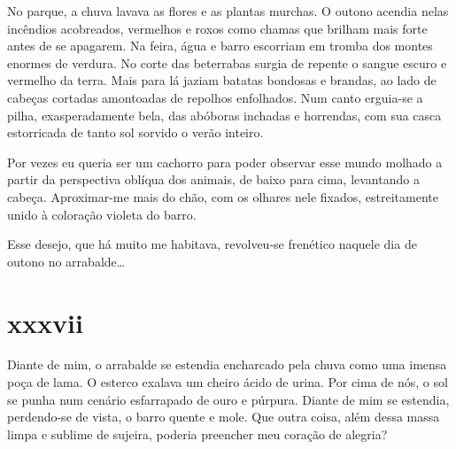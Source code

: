 No parque, a chuva lavava as flores e as plantas murchas. O outono acendia
nelas incêndios acobreados, vermelhos e roxos como chamas que brilham mais
forte antes de se apagarem. Na feira, água e barro escorriam em tromba dos
montes enormes de verdura. No corte das beterrabas surgia de repente o sangue
escuro e vermelho da terra. Mais para lá jaziam batatas bondosas e brandas,
ao lado de cabeças cortadas amontoadas de repolhos enfolhados. Num canto
erguia-se a pilha, exasperadamente bela, das abóboras inchadas e horrendas,
com sua casca estorricada de tanto sol sorvido o verão inteiro.



Por vezes eu queria ser um cachorro para poder observar esse mundo molhado a
partir da perspectiva oblíqua dos animais, de baixo para cima, levantando a
cabeça. Aproximar-me mais do chão, com os olhares nele fixados, estreitamente
unido à coloração violeta do barro.

Esse desejo, que há muito me habitava, revolveu-se frenético naquele dia de
outono no arrabalde\ldots{}


\section{xxxvii} 


Diante de mim, o arrabalde se estendia encharcado pela chuva como uma imensa
poça de lama. O esterco exalava um cheiro ácido de urina. Por cima de nós, o
sol se punha num cenário esfarrapado de ouro e púrpura. Diante de mim se
estendia, perdendo-se de vista, o barro quente e mole. Que outra coisa, além
dessa massa limpa e sublime de sujeira, poderia preencher meu coração de
alegria?

